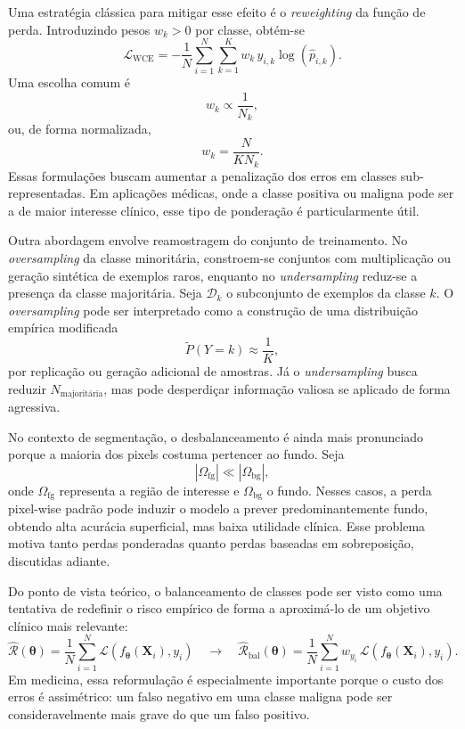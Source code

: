 \documentclass[tcc,capa]{texufpel}
\begin{document}
Uma estratégia clássica para mitigar esse efeito é o \textit{reweighting} da função de perda. Introduzindo pesos \(w_k > 0\) por classe, obtém-se
\begin{equation}
	\mathcal{L}_{\text{WCE}}
	=
	-\frac{1}{N}\sum_{i=1}^{N}\sum_{k=1}^{K} w_k\, y_{i,k}\log(\hat{p}_{i,k}).
\end{equation}
Uma escolha comum é
\begin{equation}
	w_k \propto \frac{1}{N_k},
\end{equation}
ou, de forma normalizada,
\begin{equation}
	w_k = \frac{N}{K N_k}.
\end{equation}
Essas formulações buscam aumentar a penalização dos erros em classes sub-representadas. Em aplicações médicas, onde a classe positiva ou maligna pode ser a de maior interesse clínico, esse tipo de ponderação é particularmente útil.

Outra abordagem envolve reamostragem do conjunto de treinamento. No \textit{oversampling} da classe minoritária, constroem-se conjuntos com multiplicação ou geração sintética de exemplos raros, enquanto no \textit{undersampling} reduz-se a presença da classe majoritária. Seja \(\mathcal{D}_k\) o subconjunto de exemplos da classe \(k\). O \textit{oversampling} pode ser interpretado como a construção de uma distribuição empírica modificada
\begin{equation}
	\tilde{P}(Y=k)
	\approx
	\frac{1}{K},
\end{equation}
por replicação ou geração adicional de amostras. Já o \textit{undersampling} busca reduzir \(N_{\text{majoritária}}\), mas pode desperdiçar informação valiosa se aplicado de forma agressiva.

No contexto de segmentação, o desbalanceamento é ainda mais pronunciado porque a maioria dos pixels costuma pertencer ao fundo. Seja
\begin{equation}
	|\Omega_{\text{fg}}| \ll |\Omega_{\text{bg}}|,
\end{equation}
onde \(\Omega_{\text{fg}}\) representa a região de interesse e \(\Omega_{\text{bg}}\) o fundo. Nesses casos, a perda pixel-wise padrão pode induzir o modelo a prever predominantemente fundo, obtendo alta acurácia superficial, mas baixa utilidade clínica. Esse problema motiva tanto perdas ponderadas quanto perdas baseadas em sobreposição, discutidas adiante.

Do ponto de vista teórico, o balanceamento de classes pode ser visto como uma tentativa de redefinir o risco empírico de forma a aproximá-lo de um objetivo clínico mais relevante:
\begin{equation}
	\hat{\mathcal{R}}(\boldsymbol{\theta})
	=
	\frac{1}{N}\sum_{i=1}^{N}\mathcal{L}(f_{\boldsymbol{\theta}}(\mathbf{X}_i), y_i)
	\quad \longrightarrow \quad
	\hat{\mathcal{R}}_{\text{bal}}(\boldsymbol{\theta})
	=
	\frac{1}{N}\sum_{i=1}^{N} w_{y_i}\,\mathcal{L}(f_{\boldsymbol{\theta}}(\mathbf{X}_i), y_i).
\end{equation}
Em medicina, essa reformulação é especialmente importante porque o custo dos erros é assimétrico: um falso negativo em uma classe maligna pode ser consideravelmente mais grave do que um falso positivo.
\end{document}
